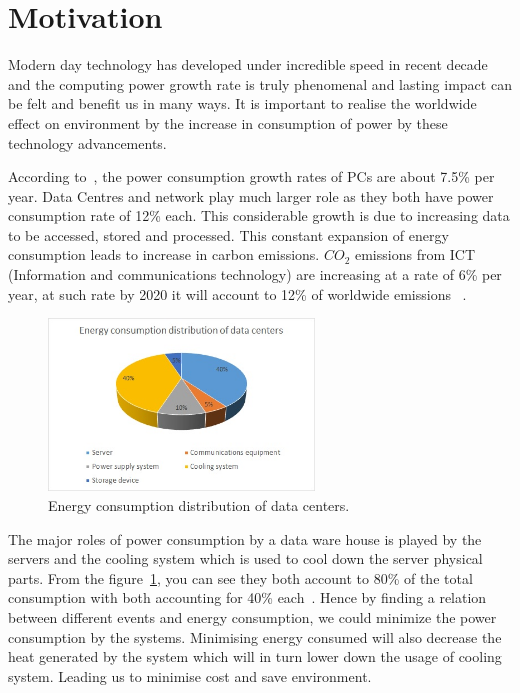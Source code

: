 \section{Motivation}
Modern day technology has developed under incredible speed in recent decade and the computing power growth rate is truly phenomenal and lasting impact can be felt and benefit us in many ways. It is important to realise the worldwide effect on environment by the increase in consumption of power by these technology advancements.

According to~\cite{pickavet2008worldwide}, the power consumption growth rates of PCs are about 7.5\% per year. Data Centres and network play much larger role as they both have power consumption rate of 12\% each. This considerable growth is due to increasing data to be accessed, stored and processed. This constant expansion of energy consumption leads to increase in carbon emissions. \(CO_2\) emissions from ICT (Information and communications technology) are increasing at a rate of 6\% per year, at such rate by 2020 it will account to 12\% of worldwide emissions ~\cite{rong2016optimizing}.

\begin{figure}[ht]
    \centering
    \includegraphics[width=200pt]{energypiechart}
    \caption{\label{fig:energypie} Energy consumption distribution of data centers.}    
\end{figure}

The major roles of power consumption by a data ware house is played by the servers and the cooling system which is used to cool down the server physical parts. From the figure~\ref{fig:energypie}, you can see they both account to 80\% of the total consumption with both accounting for 40\% each~\cite{rong2016optimizing}. Hence by finding a relation between different events and energy consumption, we could minimize the power consumption by the systems. Minimising energy consumed will also decrease the heat generated by the system which will in turn lower down the usage of cooling system. Leading us to minimise cost and save environment.

